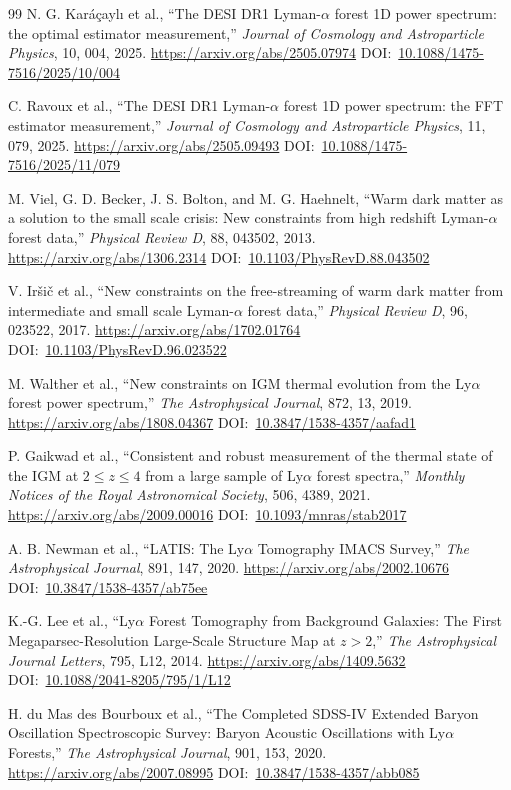\documentclass[10pt,onecolumn]{article}
\newcommand{\doi}[1]{DOI:~\href{https://doi.org/#1}{#1}}
\begin{document}
\begin{thebibliography}{99}
N. G. Kar\'a\c{c}ayl{\i} et al.,
``The DESI DR1 Lyman-$\alpha$ forest 1D power spectrum: the optimal estimator measurement,''
\emph{Journal of Cosmology and Astroparticle Physics}, 10, 004, 2025.
\url{https://arxiv.org/abs/2505.07974}
\doi{10.1088/1475-7516/2025/10/004}

C. Ravoux et al.,
``The DESI DR1 Lyman-$\alpha$ forest 1D power spectrum: the FFT estimator measurement,''
\emph{Journal of Cosmology and Astroparticle Physics}, 11, 079, 2025.
\url{https://arxiv.org/abs/2505.09493}
\doi{10.1088/1475-7516/2025/11/079}

M. Viel, G. D. Becker, J. S. Bolton, and M. G. Haehnelt,
``Warm dark matter as a solution to the small scale crisis: New constraints from high redshift Lyman-$\alpha$ forest data,''
\emph{Physical Review D}, 88, 043502, 2013.
\url{https://arxiv.org/abs/1306.2314}
\doi{10.1103/PhysRevD.88.043502}

V. Ir\v{s}i\v{c} et al.,
``New constraints on the free-streaming of warm dark matter from intermediate and small scale Lyman-$\alpha$ forest data,''
\emph{Physical Review D}, 96, 023522, 2017.
\url{https://arxiv.org/abs/1702.01764}
\doi{10.1103/PhysRevD.96.023522}

M. Walther et al.,
``New constraints on IGM thermal evolution from the Ly$\alpha$ forest power spectrum,''
\emph{The Astrophysical Journal}, 872, 13, 2019.
\url{https://arxiv.org/abs/1808.04367}
\doi{10.3847/1538-4357/aafad1}

P. Gaikwad et al.,
``Consistent and robust measurement of the thermal state of the IGM at $2\le z\le4$ from a large sample of Ly$\alpha$ forest spectra,''
\emph{Monthly Notices of the Royal Astronomical Society}, 506, 4389, 2021.
\url{https://arxiv.org/abs/2009.00016}
\doi{10.1093/mnras/stab2017}

A. B. Newman et al.,
``LATIS: The Ly$\alpha$ Tomography IMACS Survey,''
\emph{The Astrophysical Journal}, 891, 147, 2020.
\url{https://arxiv.org/abs/2002.10676}
\doi{10.3847/1538-4357/ab75ee}

K.-G. Lee et al.,
``Ly$\alpha$ Forest Tomography from Background Galaxies: The First Megaparsec-Resolution Large-Scale Structure Map at $z>2$,''
\emph{The Astrophysical Journal Letters}, 795, L12, 2014.
\url{https://arxiv.org/abs/1409.5632}
\doi{10.1088/2041-8205/795/1/L12}

H. du Mas des Bourboux et al.,
``The Completed SDSS-IV Extended Baryon Oscillation Spectroscopic Survey: Baryon Acoustic Oscillations with Ly$\alpha$ Forests,''
\emph{The Astrophysical Journal}, 901, 153, 2020.
\url{https://arxiv.org/abs/2007.08995}
\doi{10.3847/1538-4357/abb085}


\end{thebibliography}
\end{document}
